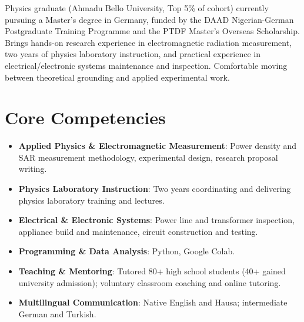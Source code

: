 \documentclass[11pt,a4paper,sans]{moderncv}
\begin{document}
\makecvtitle


\vspace{6pt}
\small{Physics graduate (Ahmadu Bello University, Top 5\% of cohort) currently pursuing a Master's degree in Germany, funded by the DAAD Nigerian-German Postgraduate Training Programme and the PTDF Master's Overseas Scholarship. Brings hands-on research experience in electromagnetic radiation measurement, two years of physics laboratory instruction, and practical experience in electrical/electronic systems maintenance and inspection. Comfortable moving between theoretical grounding and applied experimental work.}


\section{Core Competencies}
\vspace{1pt}
\begin{itemize}

\item \textbf{Applied Physics \& Electromagnetic Measurement}: Power density and SAR measurement methodology, experimental design, research proposal writing.

\item \textbf{Physics Laboratory Instruction}: Two years coordinating and delivering physics laboratory training and lectures.

\item \textbf{Electrical \& Electronic Systems}: Power line and transformer inspection, appliance build and maintenance, circuit construction and testing.

\item \textbf{Programming \& Data Analysis}: Python, Google Colab.

\item \textbf{Teaching \& Mentoring}: Tutored 80+ high school students (40+ gained university admission); voluntary classroom coaching and online tutoring.

\item \textbf{Multilingual Communication}: Native English and Hausa; intermediate German and Turkish.

\end{itemize}
\end{document}
